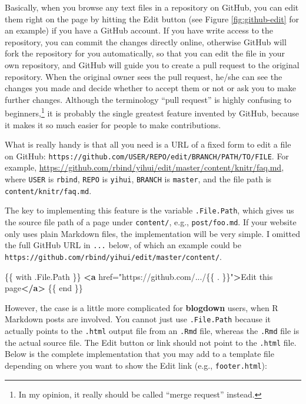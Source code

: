 \documentclass[12pt,]{krantz}
\makeatletter
\newenvironment{Shaded}{\begin{snugshade}}{\end{snugshade}}
\newcommand{\KeywordTok}[1]{\textcolor[rgb]{0.13,0.29,0.53}{\textbf{#1}}}
\newcommand{\NormalTok}[1]{#1}
\newcommand{\OtherTok}[1]{\textcolor[rgb]{0.56,0.35,0.01}{#1}}
\newcommand{\StringTok}[1]{\textcolor[rgb]{0.31,0.60,0.02}{#1}}
\newenvironment{kframe}{%
\medskip{}
\setlength{\fboxsep}{.8em}
 \def\at@end@of@kframe{}%
 \ifinner\ifhmode%
  \def\at@end@of@kframe{\end{minipage}}%
  \begin{minipage}{\columnwidth}%
 \fi\fi%
 \def\FrameCommand##1{\hskip\@totalleftmargin \hskip-\fboxsep
 \colorbox{shadecolor}{##1}\hskip-\fboxsep
     \hskip-\linewidth \hskip-\@totalleftmargin \hskip\columnwidth}%
 \MakeFramed {\advance\hsize-\width
   \@totalleftmargin\z@ \linewidth\hsize
   \@setminipage}}%
 {\par\unskip\endMakeFramed%
 \at@end@of@kframe}
\renewenvironment{Shaded}{\begin{kframe}}{\end{kframe}}
\theoremstyle{definition}
\theoremstyle{definition}
\theoremstyle{definition}
\theoremstyle{remark}
\makeatother
\begin{document}
\begin{itemize}
  Basically, when you browse any text files in a repository on GitHub,
  you can edit them right on the page by hitting the Edit button (see
  Figure \ref{fig:github-edit} for an example) if you have a GitHub
  account. If you have write access to the repository, you can commit
  the changes directly online, otherwise GitHub will fork the repository
  for you automatically, so that you can edit the file in your own
  repository, and GitHub will guide you to create a pull request to the
  original repository. When the original owner sees the pull request,
  he/she can see the changes you made and decide whether to accept them
  or not or ask you to make further changes. Although the terminology
  ``pull request'' is highly confusing to beginners,\footnote{In my
    opinion, it really should be called ``merge request'' instead.} it
  is probably the single greatest feature invented by GitHub, because it
  makes it so much easier for people to make contributions.

  What is really handy is that all you need is a URL of a fixed form to
  edit a file on GitHub:
  \texttt{https://github.com/USER/REPO/edit/BRANCH/PATH/TO/FILE}. For
  example,
  \url{https://github.com/rbind/yihui/edit/master/content/knitr/faq.md},
  where \texttt{USER} is \texttt{rbind}, \texttt{REPO} is
  \texttt{yihui}, \texttt{BRANCH} is \texttt{master}, and the file path
  is \texttt{content/knitr/faq.md}.

  The key to implementing this feature is the variable
  \texttt{.File.Path}, which gives us the source file path of a page
  under \texttt{content/}, e.g., \texttt{post/foo.md}. If your website
  only uses plain Markdown files, the implementation will be very
  simple. I omitted the full GitHub URL in \texttt{...} below, of which
  an example could be
  \texttt{https://github.com/rbind/yihui/edit/master/content/}.

\begin{Shaded}
\begin{Highlighting}[]
\NormalTok{\{\{ with .File.Path \}\}}
\KeywordTok{<a}\OtherTok{ href=}\StringTok{"https://github.com/.../\{\{ . \}\}"}\KeywordTok{>}\NormalTok{Edit this page}\KeywordTok{</a>}
\NormalTok{\{\{ end \}\}}
\end{Highlighting}
\end{Shaded}

  However, the case is a little more complicated for \textbf{blogdown}
  users, when R Markdown posts are involved. You cannot just use
  \texttt{.File.Path} because it actually points to the \texttt{.html}
  output file from an \texttt{.Rmd} file, whereas the \texttt{.Rmd} file
  is the actual source file. The Edit button or link should not point to
  the \texttt{.html} file. Below is the complete implementation that you
  may add to a template file depending on where you want to show the
  Edit link (e.g., \texttt{footer.html}):


\end{itemize}
\end{document}
